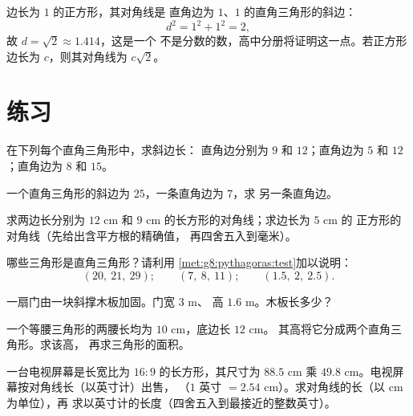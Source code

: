 \begin{example}[正方形的对角线]\label{ex:g8:pythagoras:diagonal}
边长为 $1$ 的正方形，其对角线是
直角边为 $1$、$1$ 的直角三角形的斜边：
\[
d^2 = 1^2 + 1^2 = 2 ,
\]
故 $d = \sqrt2 \approx 1.414$，这是一个
不是分数的数，高中分册将证明这一点。若正方形边长为 $c$，则其对角线为
$c\sqrt2$。
\end{example}

\section{练习}

\begin{exercise}[$\star$]\label{exo:g8:pythagoras:1}
在下列每个直角三角形中，求斜边长：
直角边分别为 $9$ 和 $12$；\quad 直角边为 $5$ 和 $12$；\quad 直角边为 $8$ 和 $15$。
\end{exercise}

\begin{exercise}[$\star$]\label{exo:g8:pythagoras:2}
一个直角三角形的斜边为 $25$，一条直角边为 $7$，求
另一条直角边。
\end{exercise}

\begin{exercise}[$\star$]\label{exo:g8:pythagoras:3}
求两边长分别为 $12$ cm 和 $9$ cm 的长方形的对角线；求边长为 $5$ cm 的
正方形的对角线（先给出含平方根的精确值，
再四舍五入到毫米）。
\end{exercise}

\begin{exercise}[$\star$]\label{exo:g8:pythagoras:4}
哪些三角形是直角三角形？请利用
\cref{met:g8:pythagoras:test}加以说明：
\[
(20,\ 21,\ 29); \qquad
(7,\ 8,\ 11); \qquad
(1.5,\ 2,\ 2.5).
\]
\end{exercise}

\begin{exercise}[$\star$]\label{exo:g8:pythagoras:5}
一扇门由一块斜撑木板加固。门宽 $3$ m、
高 $1.6$ m。木板长多少？
\end{exercise}

\begin{exercise}[$\star$]\label{exo:g8:pythagoras:6}
一个等腰三角形的两腰长均为 $10$ cm，底边长 $12$ cm。
其高将它分成两个直角三角形。求该高，
再求三角形的面积。
\end{exercise}

\begin{exercise}[$\star\star$]\label{exo:g8:pythagoras:7}
一台电视屏幕是长宽比为 $16{:}9$ 的长方形，其尺寸为 $88.5$ cm 乘
$49.8$ cm。电视屏幕按对角线长（以英寸计）出售，
（$1$ 英寸 $= 2.54$ cm）。求对角线的长（以 cm 为单位），再
求以英寸计的长度（四舍五入到最接近的整数英寸）。
\end{exercise}

